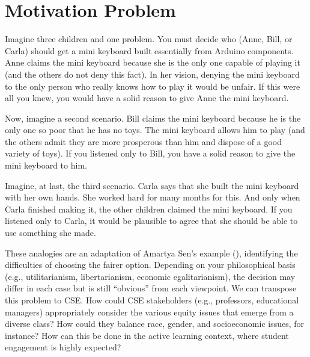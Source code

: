\section{Motivation Problem}
\label{intro-sec:mot-prob}

Imagine three children and one problem. You must decide who (Anne, Bill, or Carla) should get a mini keyboard built essentially from Arduino components. Anne claims the mini keyboard because she is the only one capable of playing it (and the others do not deny this fact). In her vision, denying the mini keyboard to the only person who really knows how to play it would be unfair. If this were all you knew, you would have a solid reason to give Anne the mini keyboard. 

Now, imagine a second scenario. Bill claims the mini keyboard because he is the only one so poor that he has no toys. The mini keyboard allows him to play (and the others admit they are more prosperous than him and dispose of a good variety of toys). If you listened only to Bill, you have a solid reason to give the mini keyboard to him. 

Imagine, at last, the third scenario. Carla says that she built the mini keyboard with her own hands. She worked hard for many months for this. And only when Carla finished making it, the other children claimed the mini keyboard. If you listened only to Carla, it would be plausible to agree that she should be able to use something she made.

These analogies are an adaptation of Amartya Sen’s example (\citeyear{sen:2009}), identifying the difficulties of choosing the fairer option. Depending on your philosophical basis (e.g., utilitarianism, libertarianism, economic egalitarianism), the decision may differ in each case but is still ``obvious'' from each viewpoint. We can transpose this problem to \gls{CSE}. How could \gls{CSE} stakeholders (e.g., professors, educational managers) appropriately consider the various equity issues that emerge from a diverse class? How could they balance race, gender, and socioeconomic issues, for instance? How can this be done in the active learning context, where student engagement is highly expected?